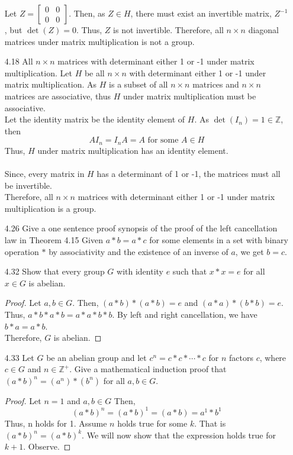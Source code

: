 \documentclass[12pt]{article}
\newcommand{\Z}{\mathds{Z}}
\begin{document}
\begin{enumerate}
			Let $ Z= \begin{bmatrix}
			0 & 0 \\
			0 & 0 
			\end{bmatrix} $. Then, as $ Z\in H $, there must exist an invertible matrix, $ Z^{-1} $, but $ \det(Z)=0 $. Thus, $ Z $ is not invertible.
			Therefore, all $n \times n$ diagonal matrices under matrix multiplication is not a group.
			\item[4.18] All $n \times n$ matrices with determinant either 1 or -1 under matrix multiplication.
			Let $ H $ be all $ n \times n $ with determinant either 1 or -1 under matrix multiplication.  As $ H $ is a subset of all $ n\times n $ matrices and $ n \times n $ matrices are associative, thus $ H $ under matrix multiplication must be associative.\\
			Let the identity matrix be the identity element of $ H $. As $ \det(I_n) = 1 \in \Z $, then
			\[AI_n=I_nA=A \text{ for some } A\in H\]
			Thus, $ H $ under matrix multiplication has an identity element.\\
			\\
			Since, every matrix in $ H $ has a determinant of 1 or -1, the matrices must all be invertible.\\
			Therefore,  all $n \times n$ matrices with determinant either 1 or -1 under matrix multiplication is a group.
			\item[4.26] Give a one sentence proof synopsis of the proof of the left cancellation law in Theorem 4.15
			Given $ a*b=a*c $ for some elements in a set with binary operation $ * $ by associativity and the existence of an inverse of $ a $, we get $ b=c $.
			\item[4.32] Show that every group $G$ with identity $e$ such that $x * x = e$ for all $x \in G$ is abelian.
			\begin{proof}
				Let $ a,b\in G $. Then, $ (a*b)*(a*b)=e $ and $ (a*a)*(b*b)=e $. Thus, $ a*b*a*b =a*a*b*b$. By left and right cancellation, we have $ b*a=a*b $. \\
				Therefore, $ G $ is abelian.
			\end{proof}
			\item[4.33] Let $G$ be an abelian group and let $c^n = c* c * \dotsb * c $ for $n$ factors $c$, where $c\in G$ and $n \in \Z^+$. Give a mathematical induction proof that $(a * b)^n = (a^n) * (b^n)$ for all $a,b \in G$.
			\begin{proof}
				Let $ n=1 $ and $ a,b\in G $ Then, 
				 \[(a*b)^n = (a*b)^1 = (a*b)= a^1 * b^1 \]
				Thus, n holds for 1. Assume $ n $ holds true for some $ k $. That is $ (a*b)^n = (a*b)^k $. We will now show that the expression holds true for $ k+1 $. Observe.

\end{proof}
\end{enumerate}
\end{document}
